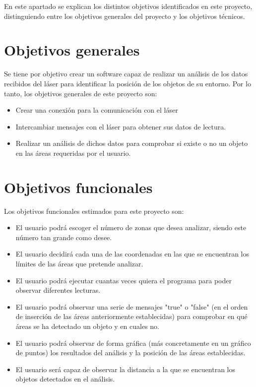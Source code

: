 
En este apartado se explican los distintos objetivos identificados en este proyecto, distinguiendo entre los objetivos generales del proyecto y los objetivos técnicos.

\section{Objetivos generales}

Se tiene por objetivo crear un software capaz de realizar un análisis de los datos recibidos del láser para identificar la posición de los objetos de su entorno. Por lo tanto, los objetivos generales de este proyecto son:
\begin{itemize}
	\item Crear una conexión para la comunicación con el láser
	\item Intercambiar mensajes con el láser para obtener sus datos de lectura.
    \item Realizar un análisis de dichos datos para comprobar si existe o no un objeto en las áreas requeridas por el usuario.
\end{itemize} 

\section{Objetivos funcionales}
Los objetivos funcionales estimados para este proyecto son:
\begin{itemize}
	\item El usuario podrá escoger el número de zonas que desea analizar, siendo este número tan grande como desee.
	\item El usuario decidirá cada una de las coordenadas en las que se encuentran los límites de las áreas que pretende analizar.
	\item El usuario podrá ejecutar cuantas veces quiera el programa para poder observar diferentes lecturas.
	\item El usuario podrá observar una serie de mensajes "true" o "false" (en el orden de inserción de las áreas anteriormente establecidas) para comprobar en qué áreas se ha detectado un objeto y en cuales no.
	\item El usuario podrá observar de forma gráfica (más concretamente en un gráfico de puntos) los resultados del análisis y la posición de las áreas establecidas.
	\item El usuario será capaz de observar la distancia a la que se encuentran los objetos detectados en el análisis.
\end{itemize}

